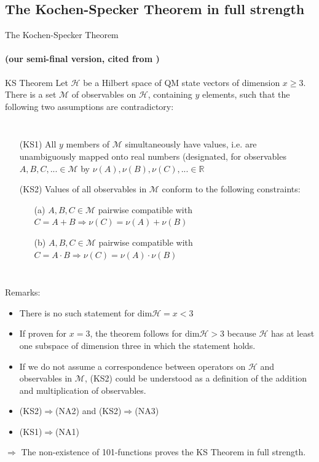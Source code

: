 \documentclass{beamer}
\begin{document}
\subsection{The Kochen-Specker Theorem in full strength}
\begin{frame}{The Kochen-Specker Theorem}
\framesubtitle{(our semi-final version, cited from \cite{sep-kochen-specker})}
\begin{block}{KS Theorem}
Let $\mathcal{H}$ be a Hilbert space of QM state vectors of dimension $x\geq3$. There is a set $\mathcal M$ of observables on $\mathcal{H}$, containing $y$ elements, such that the following two assumptions are contradictory: 
  \begin{columns}
\begin{itemize}
\item [(KS1)] All $y$ members of $\mathcal M$ simultaneously have values, i.e. are unambiguously mapped onto real numbers (designated, for observables $A,B,C,...\in\mathcal M$ by $\nu(A),\nu(B),\nu(C),...\in\mathbb{R}$
\item [(KS2)] Values of all observables in $\mathcal M$ conform to the following constraints:
\begin{itemize}
\item [(a)] $A,B,C\in\mathcal M$ pairwise compatible with $C=A+B\Rightarrow \nu(C)=\nu(A)+\nu(B)$
\item[(b)] $A,B,C\in\mathcal M$ pairwise compatible with $C=A\cdot B\Rightarrow \nu(C)=\nu(A)\cdot\nu(B)$
\end{itemize}
\end{itemize}
  \end{columns}

\end{block}
\end{frame}
\begin{frame}
Remarks:
\begin{itemize}
\item There is no such statement for $\mathrm{dim}\mathcal H=x<3$
\item If proven for $x=3$, the theorem follows for $\mathrm{dim}\mathcal H>3$ because $\mathcal H$ has at least one subspace of dimension three in which the statement holds. %
\item If we do not assume a correspondence between operators on $\mathcal H$ and observables in $\mathcal M$, (KS2) could be understood as a definition of the addition and multiplication of observables.
\item (KS2)$\Rightarrow$(NA2) and (KS2)$\Rightarrow$(NA3)
\item (KS1)$\Rightarrow$(NA1)
\end{itemize}
\vfill
\begin{center}
$\Rightarrow$ The non-existence of 101-functions proves the KS Theorem in full strength.
\end{center}
\end{frame}
\end{document}
